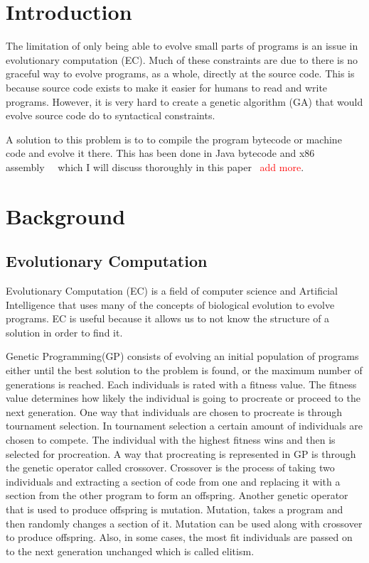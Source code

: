 \documentclass{sig-alternate}
\newcommand{\mycomment}[1]{\textcolor{red}{#1}}
\begin{document}
\terms{}

\keywords{}

\section{Introduction}
	The limitation of only being able to evolve small parts of programs is an issue in evolutionary computation (EC). Much of these constraints are due to there is no graceful way to evolve programs, as a whole, directly at the source code. This is because source code exists to make it easier for humans to read and write programs. However, it is very hard to create a genetic algorithm (GA) that would evolve source code do to syntactical constraints.\par
	A solution to this problem is to to compile the program bytecode or machine code and evolve it there. This has been done in Java bytecode and x86 assembly~\cite{FINCH:2011}~\cite{Assembly:2010} which I will discuss thoroughly in this paper ~\mycomment{add more}.
	

	
	

\section{Background}

\subsection{Evolutionary Computation}
Evolutionary Computation (EC) is a field of computer science and Artificial Intelligence that uses many of the concepts of biological evolution to evolve programs. EC is useful because it allows us to not know the structure of a solution in order to find it. \par

Genetic Programming(GP) consists of evolving an initial population of programs either until the best solution to the problem is found, or the maximum number of generations is reached. Each individuals is rated with a fitness value. The fitness value determines how likely the individual is going to procreate or proceed to the next generation. One way that individuals are chosen to procreate is through tournament selection. In tournament selection a certain amount of individuals are chosen to compete. The individual with the highest fitness wins and then is selected for procreation. A way that procreating is represented in GP is through the genetic operator called crossover. Crossover is the process of taking two individuals and extracting a section of code from one and replacing it with a section from the other program to form an offspring. Another genetic operator that is used to produce offspring is mutation. Mutation, takes a program and then randomly changes a section of it. Mutation can be used along with crossover to produce offspring. Also, in some cases, the most fit individuals are passed on to the next generation unchanged which is called elitism.
\end{document}
